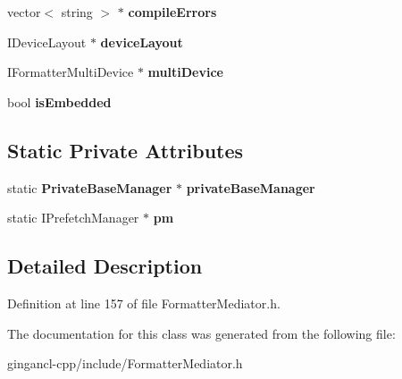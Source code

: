 \begin{CompactItemize}
\item 
vector$<$ string $>$ $\ast$ {\bf compileErrors}\label{classbr_1_1pucrio_1_1telemidia_1_1ginga_1_1ncl_1_1FormatterMediator_6b3013a608fddf6ea152aa4244036f14}

\item 
IDeviceLayout $\ast$ {\bf deviceLayout}\label{classbr_1_1pucrio_1_1telemidia_1_1ginga_1_1ncl_1_1FormatterMediator_53f8726780eb8423c7727f8cede98b8a}

\item 
IFormatterMultiDevice $\ast$ {\bf multiDevice}\label{classbr_1_1pucrio_1_1telemidia_1_1ginga_1_1ncl_1_1FormatterMediator_5887431c9649d5e32ce5c1dd04455959}

\item 
bool {\bf isEmbedded}\label{classbr_1_1pucrio_1_1telemidia_1_1ginga_1_1ncl_1_1FormatterMediator_af068bc171c04211fcec595154926e03}

\end{CompactItemize}
\subsection*{Static Private Attributes}
\begin{CompactItemize}
\item 
static {\bf PrivateBaseManager} $\ast$ {\bf privateBaseManager}\label{classbr_1_1pucrio_1_1telemidia_1_1ginga_1_1ncl_1_1FormatterMediator_59311334d07971d9cb8600a94ea26e40}

\item 
static IPrefetchManager $\ast$ {\bf pm}\label{classbr_1_1pucrio_1_1telemidia_1_1ginga_1_1ncl_1_1FormatterMediator_474182c10e86f50e85e747e8ee0843ad}

\end{CompactItemize}


\subsection{Detailed Description}




Definition at line 157 of file FormatterMediator.h.

The documentation for this class was generated from the following file:\begin{CompactItemize}
\item 
gingancl-cpp/include/FormatterMediator.h\end{CompactItemize}
